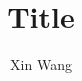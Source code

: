 \documentclass{report}
\title{Title}
\author{Xin Wang}
\begin{document}
\par
\maketitle
\medskip

\tableofcontents

\end{document}
